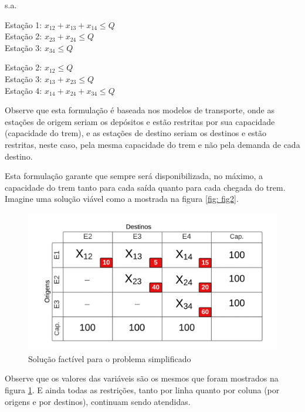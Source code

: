 s.a.


Estação 1: $x_{12} + x_{13} + x_{14} \leq Q $ \\
\indent Estação 2: $x_{23} + x_{24}  \leq  Q $ \\ 
\indent Estação 3: $x_{34} \leq Q $


Estação 2: $x_{12} \leq Q $ \\
\indent Estação 3: $x_{13} + x_{23}  \leq  Q $ \\ 
\indent Estação 4: $x_{14} + x_{24} + x_{34} \leq Q $

Observe que esta formulação é baseada nos modelos de transporte, onde as estações de origem seriam os depósitos e estão restritas por sua capacidade (capacidade do trem), e as estações de destino seriam os destinos e estão restritas, neste caso, pela mesma capacidade do trem e não pela demanda de cada destino.

Esta formulação garante que sempre será disponibilizada, no máximo, a capacidade do trem tanto para cada saída quanto para cada chegada do trem. Imagine uma solução viável como a mostrada na figura \ref{fig: fig2}.

\begin{figure}[h]
	\begin{center}
		\includegraphics[scale=0.4]{img/fig3.png}
		\caption{Solução factível para o problema simplificado}
		\label{fig: fig3}
	\end{center}
\end{figure}

Observe que os valores das variáveis são os mesmos que foram mostrados na figura \ref{fig: fig3}. E ainda todas as restrições, tanto por linha quanto por coluna (por origens e por destinos), continuam sendo atendidas.

